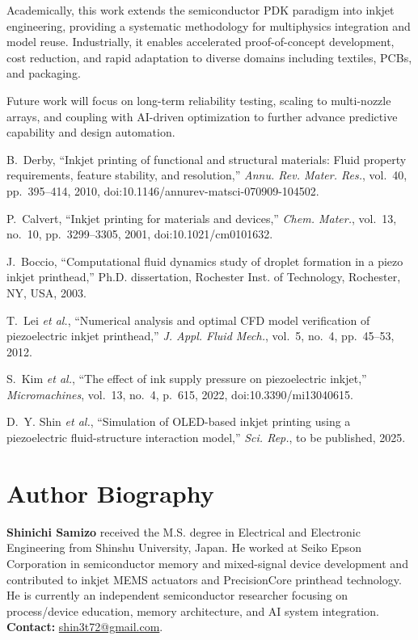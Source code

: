 \documentclass[conference]{IEEEtran}
\begin{document}
Academically, this work extends the semiconductor PDK paradigm into inkjet engineering, providing a systematic methodology for multiphysics integration and model reuse.  
Industrially, it enables accelerated proof-of-concept development, cost reduction, and rapid adaptation to diverse domains including textiles, PCBs, and packaging.  

Future work will focus on long-term reliability testing, scaling to multi-nozzle arrays, and coupling with AI-driven optimization to further advance predictive capability and design automation.

\begin{thebibliography}{99}

B.~Derby, ``Inkjet printing of functional and structural materials: Fluid property requirements, feature stability, and resolution,'' 
\emph{Annu. Rev. Mater. Res.}, vol.~40, pp.~395--414, 2010, doi:10.1146/annurev-matsci-070909-104502.

P.~Calvert, ``Inkjet printing for materials and devices,'' 
\emph{Chem. Mater.}, vol.~13, no.~10, pp.~3299--3305, 2001, doi:10.1021/cm0101632.

J.~Boccio, ``Computational fluid dynamics study of droplet formation in a piezo inkjet printhead,'' 
Ph.D. dissertation, Rochester Inst. of Technology, Rochester, NY, USA, 2003.

T.~Lei \emph{et al.}, ``Numerical analysis and optimal CFD model verification of piezoelectric inkjet printhead,'' 
\emph{J. Appl. Fluid Mech.}, vol.~5, no.~4, pp.~45--53, 2012.

S.~Kim \emph{et al.}, ``The effect of ink supply pressure on piezoelectric inkjet,'' 
\emph{Micromachines}, vol.~13, no.~4, p.~615, 2022, doi:10.3390/mi13040615.

D.~Y. Shin \emph{et al.}, ``Simulation of OLED-based inkjet printing using a piezoelectric fluid-structure interaction model,'' 
\emph{Sci. Rep.}, to be published, 2025.

\end{thebibliography}

\section*{Author Biography}
\textbf{Shinichi Samizo} received the M.S. degree in Electrical and Electronic Engineering from Shinshu University, Japan. He worked at Seiko Epson Corporation in semiconductor memory and mixed-signal device development and contributed to inkjet MEMS actuators and PrecisionCore printhead technology. He is currently an independent semiconductor researcher focusing on process/device education, memory architecture, and AI system integration. \textbf{Contact:} \href{mailto:shin3t72@gmail.com}{shin3t72@gmail.com}.
\end{document}
